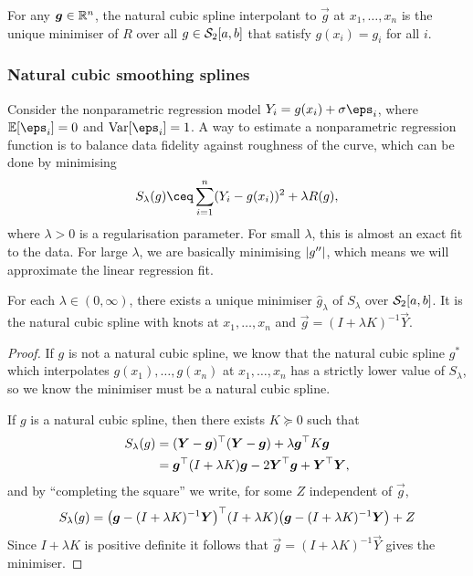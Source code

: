 \begin{proposition}
	For any $\boldsymbol g \in \mathbb R^n$, the natural cubic spline interpolant to $\vec g$ at $x_1, \dotsc, x_n$ is the unique minimiser of $R$ over all $g \in \mathcal S_2[a, b]$ that satisfy $g(x_i) = g_i$ for all $i$. 
\end{proposition}

\subsubsection{Natural cubic smoothing splines}
Consider the nonparametric regression model $Y_i = g(x_i) + \sigma \eps_i$, where $\EE[\eps_i] = 0$ and $\Var[\eps_i] = 1$. A way to estimate a nonparametric regression function is to balance data fidelity against roughness of the curve, which can be done by minimising 
\[
S_\lambda(g) \ceq \sum_{i=1}^n (Y_i - g(x_i))^2 + \lambda R(g),
\]
where $\lambda > 0$ is a regularisation parameter. For small $\lambda$, this is almost an exact fit to the data. For large $\lambda$, we are basically minimising $\abs{g''}$, which means we will approximate the linear regression fit. 

\begin{theorem}
For each $\lambda \in (0, \infty)$, there exists a unique minimiser $\hat g_\lambda$ of $S_\lambda$ over $\mathcal S_2[a, b]$. It is the natural cubic spline with knots at $x_1, \dotsc, x_n$ and $\vec g = (I + \lambda K)^{-1} \vec Y$. 
\end{theorem}

\begin{proof}
	If $g$ is not a natural cubic spline, we know that the natural cubic spline $g^*$ which interpolates $g(x_1), \dotsc, g(x_n)$ at $x_1, \dotsc, x_n$ has a strictly lower value of $S_\lambda$, so we know the minimiser must be a natural cubic spline. 
	
	If $g$ is a natural cubic spline, then there exists $K \succeq 0$ such that
	\begin{align*}
		S_\lambda(g) &= (\boldsymbol Y - \boldsymbol g)^\top (\boldsymbol Y - \boldsymbol g) + \lambda \boldsymbol g^\top K \boldsymbol g \\
		&= \boldsymbol g^\top (I + \lambda K)\boldsymbol g - 2 \boldsymbol Y^\top \boldsymbol g + \boldsymbol Y^\top\boldsymbol Y,
	\end{align*}
and by ``completing the square'' we write, for some $Z$ independent of $\vec g$, 
\[
S_\lambda(g) = \qty(\boldsymbol g - (I + \lambda K)^{-1} \boldsymbol Y)^\top (I + \lambda K) \qty(\boldsymbol g - (I + \lambda K)^{-1} \boldsymbol Y) + Z
\]
Since $I + \lambda K$ is positive definite it follows that $\vec g = (I + \lambda K)^{-1} \vec Y$ gives the minimiser. 
\end{proof}